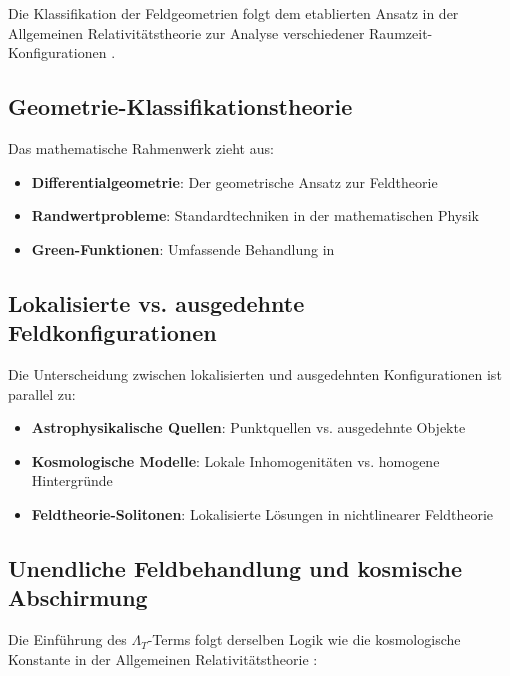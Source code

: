 \documentclass[12pt,a4paper]{article}
\begin{document}
	Die Klassifikation der Feldgeometrien folgt dem etablierten Ansatz in der Allgemeinen Relativitätstheorie zur Analyse verschiedener Raumzeit-Konfigurationen \citep{hawking1973,wald1984}.
	
	\subsection{Geometrie-Klassifikationstheorie}
	\label{subsec:geometry_theory}
	
	Das mathematische Rahmenwerk zieht aus:
	\begin{itemize}
		\item \textbf{Differentialgeometrie}: Der geometrische Ansatz zur Feldtheorie \citep{misner1973,abraham1988}
		\item \textbf{Randwertprobleme}: Standardtechniken in der mathematischen Physik \citep{stakgold1998,haberman2004}
		\item \textbf{Green-Funktionen}: Umfassende Behandlung in \citep{duffy2001,roach1982}
	\end{itemize}
	
	\subsection{Lokalisierte vs. ausgedehnte Feldkonfigurationen}
	\label{subsec:localized_extended}
	
	Die Unterscheidung zwischen lokalisierten und ausgedehnten Konfigurationen ist parallel zu:
	\begin{itemize}
		\item \textbf{Astrophysikalische Quellen}: Punktquellen vs. ausgedehnte Objekte \citep{binney2008,carroll2006}
		\item \textbf{Kosmologische Modelle}: Lokale Inhomogenitäten vs. homogene Hintergründe \citep{weinberg2008,peebles1993}
		\item \textbf{Feldtheorie-Solitonen}: Lokalisierte Lösungen in nichtlinearer Feldtheorie \citep{rajaraman1982}
	\end{itemize}
	
	\subsection{Unendliche Feldbehandlung und kosmische Abschirmung}
	\label{subsec:infinite_field_treatment}
	
	Die Einführung des $\Lambda_T$-Terms folgt derselben Logik wie die kosmologische Konstante in der Allgemeinen Relativitätstheorie \citep{einstein1917,weinberg1989}:
	
\end{document}
